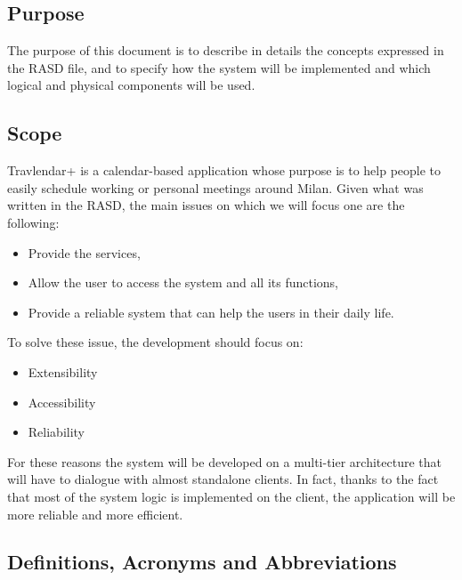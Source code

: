 \subsection{Purpose}
The purpose of this document is to describe in details the concepts expressed in the RASD file, and to specify how the system will be implemented and which logical and physical components will be used.

\subsection{Scope}
Travlendar+ is a calendar-based application whose purpose is to help people to easily schedule working or personal meetings around Milan.
Given what was written in the RASD, the main issues on which we will focus one are the following:
\begin{itemize}
\renewcommand\labelitemi{-}
\item
Provide the services,
\item
Allow the user to access the system and all its functions,
\item
Provide a reliable system that can help the users in their daily life.
\end{itemize}

To solve these issue, the development should focus on:
\begin{itemize}
\renewcommand\labelitemi{-}
\item
Extensibility
\item
Accessibility
\item
Reliability
\end{itemize}

For these reasons the system will be developed on a multi-tier architecture that will have to dialogue with almost standalone clients.
In fact, thanks to the fact that most of the system logic is implemented on the client, the application will be more reliable and more efficient.


\subsection{Definitions, Acronyms and Abbreviations}

